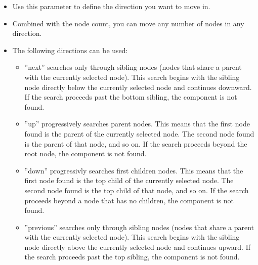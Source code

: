 \begin{itemize}
\item Use this parameter to define the direction you want to move in. 
\item Combined with the node count, you can move any number of nodes in any direction.
\item The following directions can be used:
\begin{itemize}
\item ''next'' searches only through sibling nodes (nodes that share a parent with the currently selected node). This search begins with the sibling node directly below the currently selected node and continues downward. If the search proceeds past the bottom sibling, the component is not found.
\item ''up'' progressively searches parent nodes. This means that the first node found is the parent of the currently selected node. The second node found is the parent of that node, and so on. If the search proceeds beyond the root node, the component is not found.
\item ''down'' progressivly searches first children nodes. This means that the first node found is the top child of the currently selected node. The second node found is the top child of that node, and so on. If the search proceeds beyond a node that has no children, the component is not found.
\item ''previous'' searches only through sibling nodes (nodes that share a parent with the currently selected node). This search begins with the sibling node directly above the currently selected node and continues upward. If the search proceeds past the top sibling, the component is not found.
\end{itemize}
\end{itemize}
